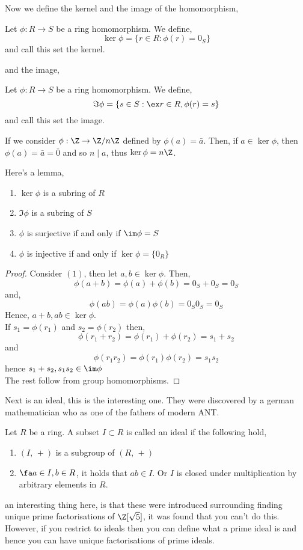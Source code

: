 Now we define the kernel and the image of the homomorphism,
\begin{ndefi}[Kernel]
  Let $\phi : R \to S$ be a ring homomorphism. We define,
  $$ \ker \phi = \{r \in R : \phi(r) = 0_S\} $$
  and call this set the kernel.
\end{ndefi}
\noindent
and the image,
\begin{ndefi}[Image]
  Let $\phi : R \to S$ be a ring homomorphism. We define,
  $$ \Im \phi = \{s \in S : \ex r \in R, \phi(r) = s\} $$
  and call this set the image.
\end{ndefi}

\begin{eg}
  If we consider $\phi : \Z \to \Z/n\Z$ defined by $\phi(a) = \bar a$. Then, if $a \in \ker\phi$, then $\phi(a) = \bar a = \bar 0$ and so $n \mid a$, thus $\ker \phi = n\Z$.
\end{eg}

Here's a lemma,
\begin{nlemma}
  \begin{enumerate}
    \item $\ker \phi$ is a subring of $R$
    \item $\Im \phi$ is a subring of $S$
    \item $\phi$ is surjective if and only if $\im\phi = S$
    \item $\phi$ is injective if and only if $\ker\phi = \{0_R\}$
  \end{enumerate}
\end{nlemma}
\begin{proof}
  Consider $(1)$, then let $a, b \in \ker \phi$. Then,
  $$ \phi(a + b) = \phi(a) + \phi(b) = 0_S + 0_S = 0_S $$
  and,
  $$ \phi(ab) = \phi(a)\phi(b) = 0_S0_S = 0_S$$
  Hence, $a+b, ab \in \ker \phi$.\\

  If $s_1 = \phi(r_1)$ and $s_2 = \phi(r_2)$ then,
  $$ \phi(r_1 + r_2) = \phi(r_1) + \phi(r_2) = s_1 + s_2 $$
  and
  $$ \phi(r_1r_2) = \phi(r_1)\phi(r_2) = s_1s_2 $$
  hence $s_1 + s_2, s_1s_2 \in \im\phi$\\

  The rest follow from group homomorphisms.
\end{proof}

Next is an ideal, this is the interesting one. They were discovered by a german mathematician who as one of the fathers of modern ANT.
\begin{ndefi}[Ideal]
  Let $R$ be a ring. A subset $I \subset R$ is called an ideal if the following hold,
  \begin{enumerate}
    \item $(I,\,+)$ is a subgroup of $(R,\,+)$
    \item $\fa a \in I, b \in R$, it holds that $ab \in I$. Or $I$ is closed under multiplication by arbitrary elements in $R$.
  \end{enumerate}
\end{ndefi}
an interesting thing here, is that these were introduced surrounding finding unique prime factorisations of $\Z[\sqrt 5]$, it was found that you can't do this. However, if you restrict to ideals then you can define what a prime ideal is and hence you can have unique factorisations of prime ideals.

